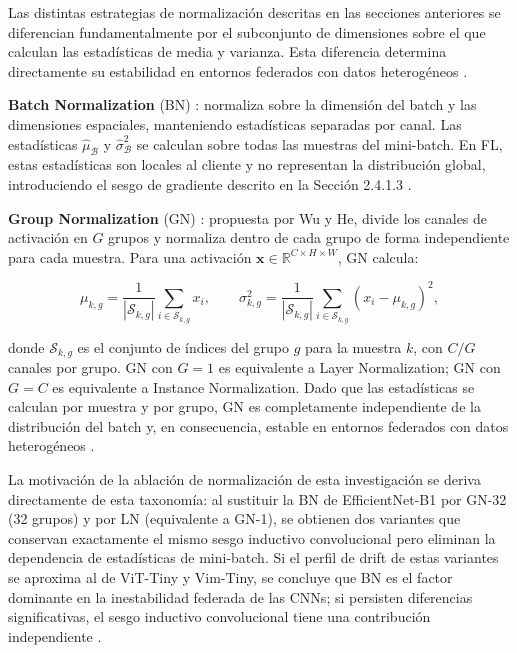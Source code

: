 Las distintas estrategias de normalización descritas en las secciones anteriores se diferencian
fundamentalmente por el subconjunto de dimensiones sobre el que calculan las estadísticas de
media y varianza. Esta diferencia determina directamente su estabilidad en entornos federados
con datos heterogéneos \cite{wang2023batch, du2022rethinking, casella2023experimentingnormalizationlayersfederated}.

\textbf{Batch Normalization} (BN) \cite{DBLP:journals/corr/IoffeS15}: normaliza
sobre la dimensión del batch y las dimensiones espaciales, manteniendo estadísticas separadas
por canal. Las estadísticas $\hat{\mu}_{\mathcal{B}}$ y $\hat{\sigma}^2_{\mathcal{B}}$ se
calculan sobre todas las muestras del mini-batch. En FL, estas estadísticas son locales al
cliente y no representan la distribución global, introduciendo el sesgo de gradiente descrito
en la Sección 2.4.1.3 \cite{wang2023batch}.

\textbf{Group Normalization} (GN) \cite{DBLP:journals/corr/abs-1803-08494}: propuesta por Wu
y He, divide los canales de activación en $G$ grupos y normaliza dentro de cada grupo de forma
independiente para cada muestra. Para una activación $\mathbf{x} \in \mathbb{R}^{C \times H
\times W}$, GN calcula:

\begin{equation}
  \mu_{k,g} = \frac{1}{|\mathcal{S}_{k,g}|}\sum_{i \in \mathcal{S}_{k,g}} x_i, \qquad
  \sigma^2_{k,g} = \frac{1}{|\mathcal{S}_{k,g}|}\sum_{i \in \mathcal{S}_{k,g}}
  (x_i - \mu_{k,g})^2,
  \label{eq:gn}
\end{equation}

donde $\mathcal{S}_{k,g}$ es el conjunto de índices del grupo $g$ para la muestra $k$, con
$C/G$ canales por grupo. GN con $G = 1$ es equivalente a Layer Normalization; GN con $G = C$
es equivalente a Instance Normalization. Dado que las estadísticas se calculan por muestra y
por grupo, GN es completamente independiente de la distribución del batch y, en consecuencia,
estable en entornos federados con datos heterogéneos \cite{DBLP:journals/corr/abs-1803-08494,
casella2023experimentingnormalizationlayersfederated}.

La motivación de la ablación de normalización de esta investigación se deriva directamente de
esta taxonomía: al sustituir la BN de EfficientNet-B1 por GN-32 (32 grupos) y por LN
(equivalente a GN-1), se obtienen dos variantes que
conservan exactamente el mismo sesgo inductivo convolucional pero eliminan la dependencia de estadísticas
de mini-batch. Si el
perfil de drift de estas variantes se aproxima al de ViT-Tiny y Vim-Tiny, se concluye que BN
es el factor dominante en la inestabilidad federada de las CNNs; si persisten diferencias
significativas, el sesgo inductivo convolucional tiene una contribución independiente
\cite{pieri2023handlingdataheterogeneityarchitectural, siomos2024architecture}.


